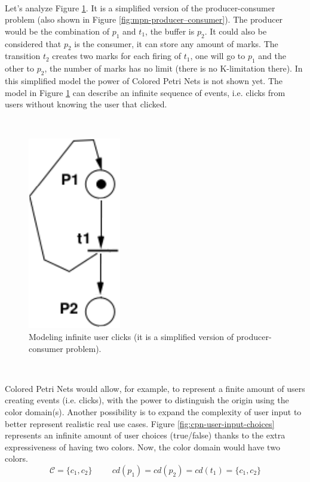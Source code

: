 \documentclass[12pt,english]{article} %
\begin{document}
\

Let's analyze Figure \ref{fig:cpn-user-input-clicks}.
It is a simplified version of the producer-consumer problem (also shown in Figure \ref{fig:mpn-producer–consumer}).
The producer would be the combination of $p_1$ and $t_1$, the buffer is $p_2$.
It could also be considered that $p_2$ is the consumer, it can store any amount of marks.
The transition $t_2$ creates two marks for each firing of $t_1$, one will go to $p_1$ and the other to $p_2$, the number of marks has no limit (there is no K-limitation there).
In this simplified model the power of Colored Petri Nets is not shown yet.
The model in Figure \ref{fig:cpn-user-input-clicks} can describe an infinite sequence of events, i.e. clicks from users without knowing the user that clicked.

\

\begin{figure}[H]
    \centering
    \includegraphics[scale=0.41]{img/petri-net/cpn/cpn-user-input-clicks.png}
    \caption{Modeling infinite user clicks (it is a simplified version of producer-consumer problem).}
    \label{fig:cpn-user-input-clicks}
\end{figure}

\

Colored Petri Nets would allow, for example, to represent a finite amount of users creating events (i.e. clicks), with the power to distinguish the origin using the color domain(s).
Another possibility is to expand the complexity of user input to better represent realistic real use cases.
Figure \ref{fig:cpn-user-input-choices} represents an infinite amount of user choices (true/false) thanks to the extra expressiveness of having two colors.
Now, the color domain would have two colors.
$$\mathcal{C} = \{c_1, c_2\} \hspace{1cm} cd(p_1) = cd(p_2) = cd(t_1) = \{c_1, c_2\} $$
\end{document}
